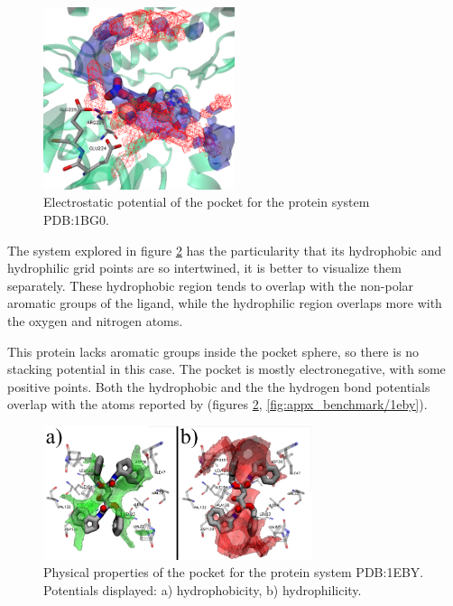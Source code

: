    \begin{figure}[H]
      \centering
      \includegraphics[width=0.5\textwidth]{figures/results/benchmark_prot/1bg0.png}
      \caption{\label{fig:benchmark/1bg0} Electrostatic potential of the pocket for the protein system PDB:1BG0.}
    \end{figure}

    The system explored in figure \ref{fig:benchmark/1eby} has the particularity that its hydrophobic and hydrophilic grid points are so intertwined, it is better to visualize them separately. These hydrophobic region tends to overlap with the non-polar aromatic groups of the ligand, while the hydrophilic region overlaps more with the oxygen and nitrogen atoms.

    This protein lacks aromatic groups inside the pocket sphere, so there is no stacking potential in this case. The pocket is mostly electronegative, with some positive points. Both the hydrophobic and the the hydrogen bond potentials overlap with the atoms reported by \cite{benchmark_strong_2021} (figures \ref{fig:benchmark/1eby}, \ref{fig:appx_benchmark/1eby}).

    \begin{figure}[H]
      \centering
      \includegraphics[width=0.7\textwidth]{figures/results/benchmark_prot/1eby.png}
      \caption{\label{fig:benchmark/1eby} Physical properties of the pocket for the protein system PDB:1EBY. Potentials displayed: a) hydrophobicity, b) hydrophilicity.}
    \end{figure}

